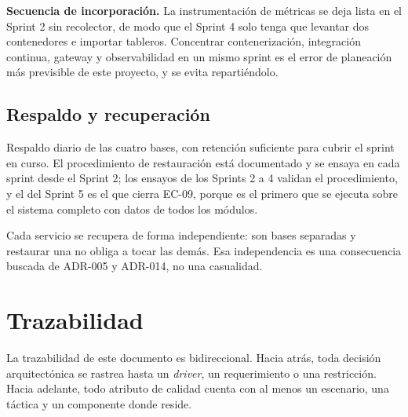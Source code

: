 \documentclass[11pt,a4paper]{article}
\begin{document}
\noindent\textbf{Secuencia de incorporación.} La instrumentación de métricas se deja lista en el Sprint 2 sin recolector, de modo que el Sprint 4 solo tenga que levantar dos contenedores e importar tableros. Concentrar contenerización, integración continua, gateway y observabilidad en un mismo sprint es el error de planeación más previsible de este proyecto, y se evita repartiéndolo.

\subsection{Respaldo y recuperación}

Respaldo diario de las cuatro bases, con retención suficiente para cubrir el sprint en curso. El procedimiento de restauración está documentado y se ensaya en cada sprint desde el Sprint 2; los ensayos de los Sprints 2 a 4 validan el procedimiento, y el del Sprint 5 es el que cierra EC-09, porque es el primero que se ejecuta sobre el sistema completo con datos de todos los módulos.

Cada servicio se recupera de forma independiente: son bases separadas y restaurar una no obliga a tocar las demás. Esa independencia es una consecuencia buscada de ADR-005 y ADR-014, no una casualidad.

\section{Trazabilidad}
\label{sec:trazabilidad}

La trazabilidad de este documento es bidireccional. Hacia atrás, toda decisión arquitectónica se rastrea hasta un \emph{driver}, un requerimiento o una restricción. Hacia adelante, todo atributo de calidad cuenta con al menos un escenario, una táctica y un componente donde reside.
\end{document}
